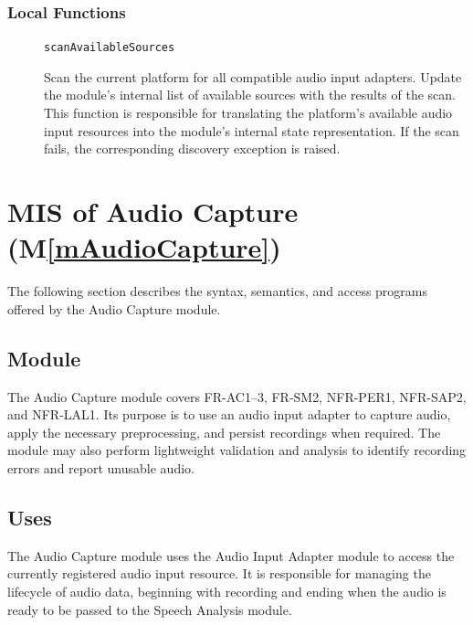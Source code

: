 \documentclass[12pt, titlepage]{article}
\newcommand{\mref}[1]{M\ref{#1}}
\begin{document}
\begin{description}
\end{description}

\subsubsection{Local Functions}

\begin{description}

\item[]\texttt{scanAvailableSources}\par
Scan the current platform for all compatible audio input adapters. Update the module's internal list of available sources with the results of the scan. This function is responsible for translating the platform's available audio input resources into the module's internal state representation. If the scan fails, the corresponding discovery exception is raised.
\end{description}

\clearpage

\section{MIS of Audio Capture (\mref{mAudioCapture})} \label{mis:audio-capture}

The following section describes the syntax, semantics, and access programs offered by the Audio Capture module.

\subsection{Module}

The Audio Capture module covers FR-AC1--3, FR-SM2, NFR-PER1, NFR-SAP2, and NFR-LAL1. Its purpose is to use an audio input adapter to capture audio, apply the necessary preprocessing, and persist recordings when required. The module may also perform lightweight validation and analysis to identify recording errors and report unusable audio.

\subsection{Uses}

The Audio Capture module uses the Audio Input Adapter module to access the currently registered audio input resource. It is responsible for managing the lifecycle of audio data, beginning with recording and ending when the audio is ready to be passed to the Speech Analysis module.
\end{document}
